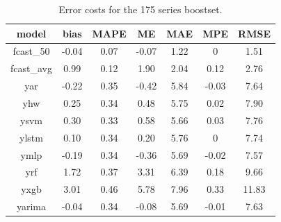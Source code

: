 \documentclass[preprint,11pt,authoryear]{elsarticle}
\begin{document}
\begin{table}
	\centering
	\renewcommand{\arraystretch}{0.75}
	\begin{tabular}{ccccccc}
		model & bias & MAPE & ME & MAE & MPE & RMSE \\
		\hline
		fcast\_50  & -0.04 & 0.07 & -0.07 & 1.22 & 0     & 1.51 \\
		fcast\_avg & 0.99  & 0.12 & 1.90  & 2.04 & 0.12  & 2.76 \\
		yar        & -0.22 & 0.35 & -0.42 & 5.84 & -0.03 & 7.64 \\
		yhw        & 0.25  & 0.34 & 0.48  & 5.75 & 0.02  & 7.90 \\
		ysvm       & 0.30  & 0.33 & 0.58  & 5.66 & 0.03  & 7.76 \\
		ylstm      & 0.10  & 0.34 & 0.20  & 5.76 & 0     & 7.74 \\
		ymlp       & -0.19 & 0.34 & -0.36 & 5.69 & -0.02 & 7.57 \\
		yrf        & 1.72  & 0.37 & 3.31  & 6.39 & 0.18  & 9.66 \\
		yxgb       & 3.01  & 0.46 & 5.78  & 7.96 & 0.33  & 11.83\\
		yarima     & -0.04 & 0.34 & -0.08 & 5.69 & -0.01 & 7.63 \\
		\hline
	\end{tabular}
	\caption{Error costs for the 175 series boostset.}
	\label{table:app175}
\end{table}

 

\end{document}
